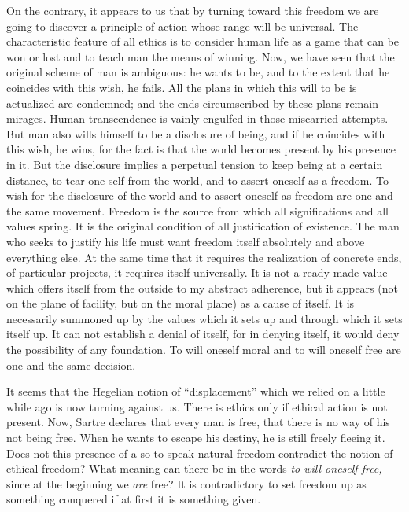 \documentclass[11pt]{article}
\begin{document}
On the contrary, it appears to us that by turning toward this freedom we are going to discover a principle of action whose range will be universal. The characteristic feature of all ethics is to consider human life as a game that can be won or lost and to teach man the means of winning. Now, we have seen that the original scheme of man is ambiguous: he wants to be, and to the extent that he coincides with this wish, he fails. All the plans in which this will to be is actualized are condemned; and the ends circumscribed by these plans remain mirages. Human transcendence is vainly engulfed in those miscarried attempts. But man also wills himself to be a disclosure of being, and if he coincides with this wish, he wins, for the fact is that the world becomes present by his presence in it. But the disclosure implies a perpetual tension to keep being at a certain distance, to tear one self from the world, and to assert oneself as a freedom. To wish for the disclosure of the world and to assert oneself as freedom are one and the same movement. Freedom is the source from which all significations and all values spring. It is the original condition of all justification of existence. The man who seeks to justify his life must want freedom itself absolutely and above everything else. At the same time that it requires the realization of concrete ends, of particular projects, it requires itself universally. It is not a ready-made value which offers itself from the outside to my abstract adherence, but it appears (not on the plane of facility, but on the moral plane) as a cause of itself. It is necessarily summoned up by the values which it sets up and through which it sets itself up. It can not establish a denial of itself, for in denying itself, it would deny the possibility of any foundation. To will oneself moral and to will oneself free are one and the same decision.

It seems that the Hegelian notion of “displacement” which we relied on a little while ago is now turning against us. There is ethics only if ethical action is not present. Now, Sartre declares that every man is free, that there is no way of his not being free. When he wants to escape his destiny, he is still freely fleeing it. Does not this presence of a so to speak natural freedom contradict the notion of ethical freedom? What meaning can there be in the words \textit{to will oneself free,} since at the beginning we \textit{are} free? It is contradictory to set freedom up as something conquered if at first it is something given.
\end{document}
